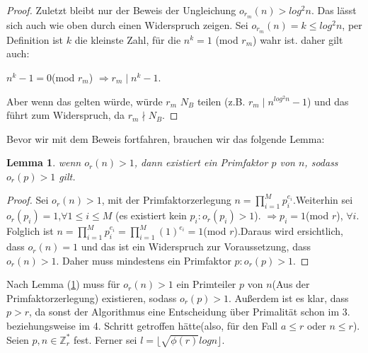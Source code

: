 \documentclass[12pt,oneside]{article}
\newtheorem{lemma}[theorem]{Lemma}
\theoremstyle{remark}
\theoremstyle{definition}
\begin{document}
\begin{proof}
Zuletzt bleibt nur der Beweis der Ungleichung $o_{r_{m}}(n) > log^2 n$. Das lässt sich auch wie oben durch einen Widerspruch zeigen. Sei $o_{r_{m}}(n) = k \leq log^2 n$, per Definition ist $k$ die kleinste Zahl, für die $n^k = 1$ (mod $r_{m}$) wahr ist. daher gilt auch:\newline\newline
\centerline{$n^k - 1 = 0 $(mod  $r_{m}$) $\Rightarrow r_{m} \mid n^k - 1$.}

Aber wenn das gelten würde, würde $r_{m}$ $N_{B}$ teilen (z.B. $ r_{m} \mid n^{log^2 n} -1$) und das führt zum Widerspruch, da $r_{m} \nmid N_{B}$. 
\end{proof}

Bevor wir mit dem Beweis fortfahren, brauchen wir das folgende Lemma:

\begin{lemma}\label{ord_prime_l}
wenn $o_{r}(n) > 1$, dann existiert ein Primfaktor $p$ von $n$, sodass $o_{r}(p) > 1$ gilt. 
\end{lemma}
\begin{proof}
Sei $o_{r}(n) > 1$, mit der Primfaktorzerlegung $n = \prod_{i = 1}^{M} p_{i}^{e_{i}}$.\newline\newline Weiterhin sei $o_{r}(p_{i}) = 1$,$\forall 1 \leq i \leq M$ (es existiert kein $p_{i} : o_{r}(p_{i}) > 1$).\newline\newline
$\Rightarrow p_{i} = 1 $(mod $r$), $\forall i$. Folglich ist $n = \prod_{i = 1} ^{M} p_{i}^{e_{i}} = \prod_{i = 1} ^{M}(1)^{e_{i}} = 1 $(mod $r$).\newline\newline Daraus wird ersichtlich, dass $o_{r}(n) = 1$ und das ist ein Widerspruch zur Voraussetzung, dass $o_{r}(n) > 1$. Daher muss mindestens ein Primfaktor $p : o_{r}(p) > 1$.  
\end{proof}

\smallskip

Nach Lemma (\ref{ord_prime_l}) muss für  $o_{r}(n) > 1$ ein Primteiler $p$ von $n$(Aus der Primfaktorzerlegung) existieren, sodass $o_{r}(p) > 1$. Außerdem ist es klar, dass $p > r$, da sonst der Algorithmus eine Entscheidung über Primalität schon im 3. beziehungsweise im 4. Schritt getroffen hätte(also, für den Fall $a \leq r$ oder $n \leq r$). Seien $p,n \in \mathbb{Z}_{r}^{*}$ fest. Ferner sei  $l = \lfloor \sqrt{\phi(r)} log n \rfloor$.\newline\newline
\end{document}
